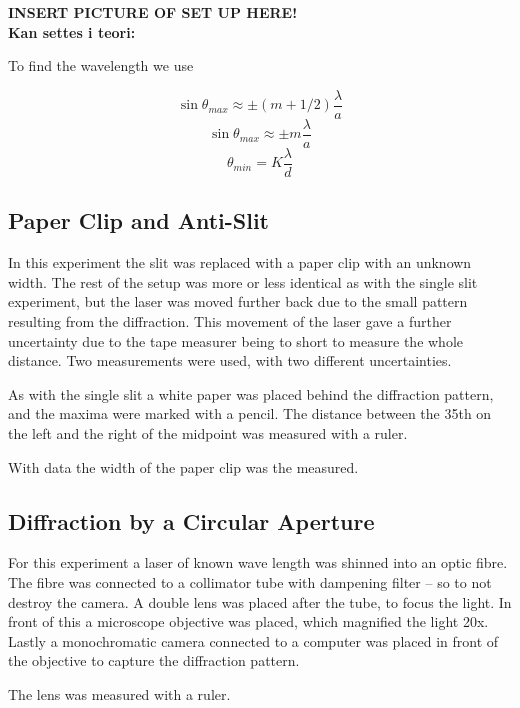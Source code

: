 \documentclass{emulateapj}
\begin{document}
\textbf{INSERT PICTURE OF SET UP HERE!}\\

\textbf{Kan settes i teori:}

To find the wavelength we use 

\begin{equation}
\sin \theta_{max} \approx \pm (m+1/2)\frac{\lambda}{a}
\end{equation}\label{eq:slitMax}
\begin{equation}
\sin \theta_{max} \approx \pm m\frac{\lambda}{a}
\end{equation}\label{eq:paperClipMax}
\begin{equation}
\theta_{min} = K\frac{\lambda}{d}
\end{equation}\label{eq:diffLimit}

\subsection{Paper Clip and Anti-Slit}
In this experiment the slit was replaced with a paper clip with an unknown width. The rest of the setup was more or less identical as with the single slit experiment, but the laser was moved further back due to the small pattern resulting from the diffraction. This movement of the laser gave a further uncertainty due to the tape measurer being to short to measure the whole distance. Two measurements were used, with two different uncertainties.

As with the single slit a white paper was placed behind the diffraction pattern, and the maxima were marked with a pencil. The distance between the 35th on the left and the right of the midpoint was measured with a ruler.

With data the width of the paper clip was the measured.

\subsection{Diffraction by a Circular Aperture}
For this experiment a laser of known wave length was shinned into an optic fibre. The fibre was connected to a collimator tube with dampening filter -- so to not destroy the camera. A double lens was placed after the tube, to focus the light. In front of this a microscope objective was placed, which magnified the light 20x. Lastly a monochromatic camera connected to a computer was placed in front of the objective to capture the diffraction pattern.

The lens was measured with a ruler.
\end{document}
